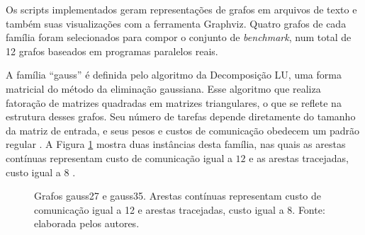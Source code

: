 \documentclass[fleqn,10pt]{SelfArx} %
\begin{document}
Os scripts implementados geram representações de grafos em arquivos de texto e também suas visualizações com a ferramenta Graphviz. Quatro grafos de cada família foram selecionados para compor o conjunto de \textit{benchmark}, num total de 12 grafos baseados em programas paralelos reais.

A família ``gauss'' é definida pelo algoritmo da Decomposição LU, uma forma matricial do método da eliminação gaussiana. Esse algoritmo que realiza fatoração de matrizes quadradas em matrizes triangulares, o que se reflete na estrutura desses grafos. Seu número de tarefas depende diretamente do tamanho da matriz de entrada, e seus pesos e custos de comunicação obedecem um padrão regular \cite{jiang}. A Figura \ref{fig:gauss} mostra duas instâncias desta família, nas quais as arestas contínuas representam custo de comunicação igual a $12$ e as arestas tracejadas, custo igual a $8$ \cite{COSNARD1988275}.


\begin{figure}
  \centering
  \caption{Grafos gauss27 e gauss35. Arestas contínuas representam custo de comunicação igual a 12 e arestas tracejadas, custo igual a 8. Fonte: elaborada pelos autores.}
   \label{fig:gauss}
\end{figure}
\end{document}

